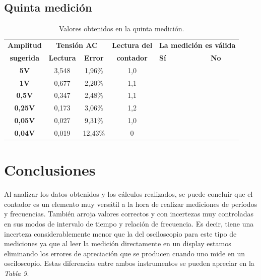 \documentclass{article}
\newcommand{\tick}{\ding{52}}
\begin{document}
\subsection{Quinta medición}


\begin{table}[!hbt]
	\begin{center}

		\begin{tabular}{|c|c|c|c|>{\centering}p{1.65cm}|c|} \hline
			\textbf{Amplitud} & \multicolumn{2}{c|}{\textbf{Tensión AC}} & \textbf{Lectura del} & \multicolumn{2}{c|}{\textbf{La medición es válida}} \\\cline{2-3}\cline{5-6}
			\textbf{sugerida} & \textbf{Lectura} & \textbf{Error} & \textbf{contador} & \textbf{Sí} & \textbf{No} \\\hline
			
			\textbf{5V} & 3,548 & 1,96\% & 1,0 & \tick &  \\\hline
			\textbf{1V} & 0,677 & 2,20\% & 1,1 &  &  \\\hline
			\textbf{0,5V} & 0,347 & 2,48\% & 1,1 &  &  \\\hline
			\textbf{0,25V} & 0,173 & 3,06\% & 1,2 &  &  \\\hline
			\textbf{0,05V} & 0,027 & 9,31\% & 1,0 &  &  \\\hline
			\textbf{0,04V} & 0,019 & 12,43\% & 0 &  &  \\\hline

		\end{tabular}

	\caption{Valores obtenidos en la quinta medición.}
	\end{center}
\end{table}
\medskip




\section{Conclusiones}

	
	Al analizar los datos obtenidos y los cálculos realizados, se puede concluir que el contador es un elemento muy versátil a la hora de realizar mediciones de períodos y frecuencias. También arroja valores correctos y con incertezas muy controladas en sus modos de intervalo de tiempo y relación de frecuencia. Es decir, tiene una incerteza considerablemente menor que la del osciloscopio para este tipo de mediciones ya que al leer la medición directamente en un display estamos eliminando los errores de apreciación que se producen cuando uno mide en un osciloscopio. Estas diferencias entre ambos instrumentos se pueden apreciar en la \textit{Tabla 9}.
\bigskip\bigskip
\end{document}
